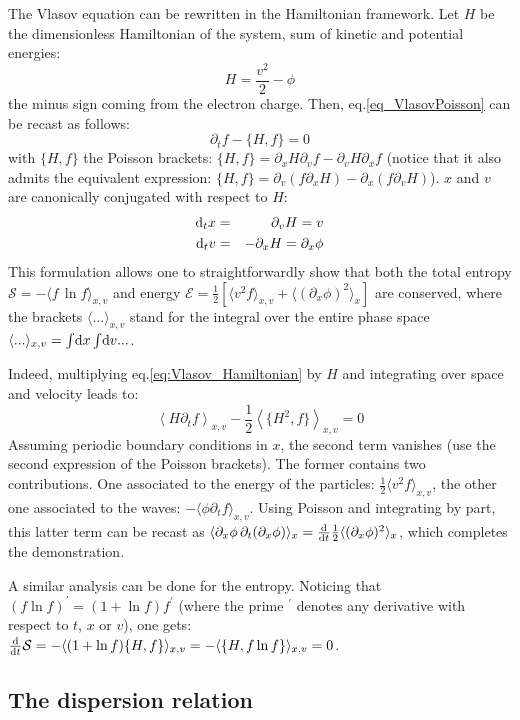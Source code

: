 \documentclass[11pt]{article}
\newcommand{\dd}{\textrm d}
\newcommand{\beq}{\begin{equation}}
\newcommand{\eeq}{\end{equation}}
\newcommand{\beqs}{\begin{equation*}}
\newcommand{\eeqs}{\end{equation*}}
\newcommand{\beqa}{\begin{eqnarray}}
\newcommand{\eeqa}{\end{eqnarray}}
\begin{document}
The Vlasov equation  can be rewritten in the Hamiltonian framework. Let $H$ be the dimensionless Hamiltonian of the system, sum of kinetic and potential energies:
\beq \label{eq:Hamiltonian}
H = \frac{v^2}{2} - \phi
\eeq
the minus sign coming from the electron charge. Then, eq.\eqref{eq_VlasovPoisson} can be recast as follows:
\beq \label{eq:Vlasov_Hamiltonian}
\partial_t f -\{H,f\} = 0
\eeq
with $\{H,f\}$ the Poisson brackets: $\{H,f\} = \partial_x H\partial_v f - \partial_v H\partial_x f$ (notice that it also admits the equivalent expression: $\{H,f\} = \partial_v(f\partial_x H) - \partial_x(f\partial_v H)$). $x$ and $v$ are canonically conjugated with respect to $H$:
\beqa
\dd_t x &=& \partial_v H = v \\
\dd_t v &=& -\partial_x H = \partial_x\phi
\eeqa
This formulation allows one to straightforwardly show that both the total entropy $\mathcal{S} = -\langle f\, \ln f\rangle_{x,v}$ and energy $\mathcal{E} = \frac{1}{2} \left[\langle v^2 f\rangle_{x,v} + \langle(\partial_x\phi)^2\rangle_x \right]$ are conserved, where the brackets $\langle ...\rangle_{x,v}$ stand for the integral over the entire phase space $\langle ...\rangle_{x,v} = \int\!\dd x \int\!\dd v ...$.

\noindent 
Indeed, multiplying eq.\eqref{eq:Vlasov_Hamiltonian} by $H$ and integrating over space and velocity leads to:
\beqs
\left\langle H\partial_t f \right\rangle_{x,v} 
- \frac{1}{2}\left\langle \{H^2,f\} \right\rangle_{x,v} = 0
\eeqs
Assuming periodic boundary conditions in $x$, the second term vanishes (use the second expression of the Poisson brackets). The former contains two contributions. One associated to the energy of the particles: $\frac{1}{2} \langle v^2 f\rangle_{x,v}$, the other one associated to the waves: $-\langle \phi \partial_t f\rangle_{x,v}$. Using Poisson and integrating by part, this latter term can be recast as $\langle \partial_x\phi \, \partial_t(\partial_x\phi) \rangle_x = \frac{\dd}{\dd t}  \frac{1}{2} \langle (\partial_x\phi)^2 \rangle_x$, which completes the demonstration.

\noindent 
A similar analysis can be done for the entropy. Noticing that $(f\ln f)^\prime = (1+\ln f)f^\prime$ (where the prime $^\prime$ denotes any derivative with respect to $t$, $x$ or $v$), one gets: $\frac{\dd}{\dd t}\mathcal{S} = -\langle (1+ \ln f) \{H,f\}\rangle_{x,v} = -\langle \{H,f\ln f\}\rangle_{x,v} = 0$.

\subsection{The dispersion relation}
\label{ss_disp_relation}
\end{document}
